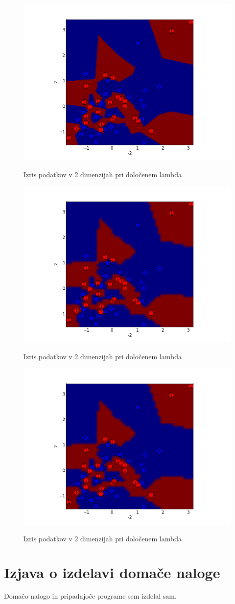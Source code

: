 \documentclass[a4paper,11pt]{article}
\begin{document}
\begin{figure}[htbp]
\begin{center}
\includegraphics[scale=0.3]{fig11.png}
\caption{Izris podatkov v 2 dimenzijah pri določenem lambda}
\label{slika4}
\includegraphics[scale=0.3]{fig12.png}
\caption{Izris podatkov v 2 dimenzijah pri določenem lambda}
\label{slika5}
\includegraphics[scale=0.3]{fig13.png}
\caption{Izris podatkov v 2 dimenzijah pri določenem lambda}
\label{slika6}
\end{center}
\end{figure}
\section{Izjava o izdelavi domače naloge}
Domačo nalogo in pripadajoče programe sem izdelal sam.
\end{document}
